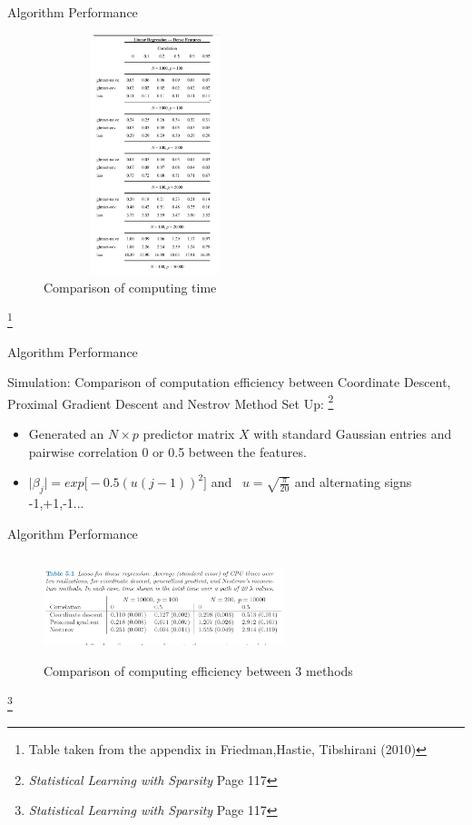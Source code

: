 \documentclass{beamer}
\begin{document}
\begin{frame}{Algorithm Performance}
\begin{figure}[h]
\centering
\includegraphics[width=6.5cm,height=7cm]{img/table1}
\caption{Comparison of computing time}
\end{figure}
\footnote{Table taken from the appendix in Friedman,Hastie, Tibshirani (2010) }
\end{frame}

\begin{frame}{Algorithm Performance}
\begin{block}{Simulation: Comparison of computation efficiency between Coordinate Descent, Proximal Gradient Descent and Nestrov Method}
\vspace*{3mm}
Set Up: \footnote{\textit{Statistical Learning with Sparsity} Page 117}
\begin{itemize}
    \item Generated an \(N \times p\) predictor matrix $X$ with standard Gaussian entries and pairwise correlation 0 or 0.5 between the features.
    \vspace*{3mm}
    \item \(\lvert \beta_j \rvert =exp \big[ -0.5(u(j-1))^2\big] \) and \ 
    \(u=\sqrt{\frac{\pi}{20}}\) and alternating signs -1,+1,-1...
\end{itemize}
\end{block}
\end{frame}

\begin{frame}{Algorithm Performance}
\begin{figure}[h]
\centering
\includegraphics[width=7cm,height=3cm]{img/table2}
\caption{Comparison of computing efficiency between 3 methods}
\end{figure}
 \footnote{\textit{Statistical Learning with Sparsity} Page 117}  
\end{frame}
\end{document}
